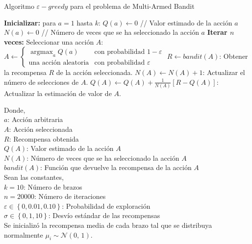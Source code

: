 \documentclass[12pt]{article}
\DeclareMathOperator*{\argmax}{argmax}
\begin{document}
    \begin{algorithm}[H]
        \caption{Algoritmo $\varepsilon-greedy$ para el problema de Multi-Armed Bandit}
        \begin{algorithmic}[1]
            \State \textbf{Inicializar:} para $a = 1$ hasta $k$:
            \State \quad $Q(a) \leftarrow 0$ \quad // Valor estimado de la acción $a$
            \State \quad $N(a) \leftarrow 0$ \quad // Número de veces que se ha seleccionado la acción $a$
            \State \textbf{Iterar $n$ veces:}
            \State \quad Seleccionar una acción $A$:
            \State \quad \quad $A \leftarrow
            \begin{cases}
                \argmax_{a} Q(a) & \text{con probabilidad } 1 - \varepsilon \\
                \text{una acción aleatoria} & \text{con probabilidad } \varepsilon
            \end{cases}$
            \State \quad $R \leftarrow bandit(A)$: Obtener la recompensa $R$ de la acción seleccionada.
            \State \quad $N(A) \leftarrow N(A) + 1$: Actualizar el número de selecciones de $A$.
            \State \quad $Q(A) \leftarrow Q(A) + \frac{1}{N(A)} [R - Q(A)]$: Actualizar la estimación de valor de $A$.
        \end{algorithmic}\label{alg:epsilon_greedy}
    \end{algorithm}

    Donde,\\
    $a$: Acción arbitraria \\
    $A$: Acción seleccionada \\
    $R$: Recompensa obtenida \\
    $Q(A)$: Valor estimado de la acción $A$ \\
    $N(A)$: Número de veces que se ha seleccionado la acción $A$ \\
    $bandit(A)$: Función que devuelve la recompensa de la acción $A$ \\

    Sean las constantes, \\
    $k = 10$: Número de brazos \\
    $n = 20000$: Número de iteraciones \\
    $\varepsilon \in \left\{ 0, 0.01, 0.10 \right\}$: Probabilidad de exploración \\
    $\sigma \in \left\{ 0, 1, 10 \right\}$: Desvío estándar de las recompensas \\

    Se inicializó la recompensa media de cada brazo tal que se distribuya normalmente $\mu_{i} \sim \mathcal{N}(0,\,1)$.
\end{document}
